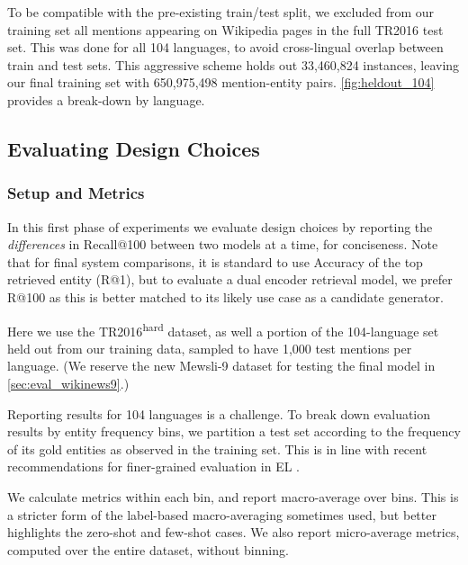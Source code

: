 \documentclass[11pt,a4paper]{article}
\newcommand*{\TR}{TR2016\textsuperscript{hard}}
\begin{document}
To be compatible with the pre-existing train/test split, we excluded from our training set all mentions appearing on Wikipedia pages in the full TR2016 test set.
This was done for all 104 languages, to avoid cross-lingual overlap between train and test sets.
This aggressive scheme holds out 33,460,824 instances, leaving our final training set with 650,975,498 mention-entity pairs. \autoref{fig:heldout_104} provides a break-down by language.

\subsection{Evaluating Design Choices}\label{sec:eval_design_choices}

\subsubsection{Setup and Metrics}
In this first phase of experiments we evaluate design choices by reporting the \emph{differences} in Recall@100 between two models at a time, for conciseness.
Note that for final system comparisons, it is standard to use Accuracy of the top retrieved entity (R@1), but to evaluate a dual encoder retrieval model, we prefer R@100 as this is better matched to its likely use case as a candidate generator.

Here we use the \TR{} dataset, as well a portion of the 104-language set held out from our training data, sampled to have 1,000 test mentions per language.
(We reserve the new \mbox{Mewsli-9} dataset for testing the final model in \autoref{sec:eval_wikinews9}.)

Reporting results for 104 languages is a challenge. 
To break down evaluation results by entity
frequency bins, we partition a test set according to the frequency of its gold entities as observed in the training set.
This is in line with recent recommendations for finer-grained evaluation in EL \citep{waitelonis-gerbil2016,ilievski-etal-2018-systematic}.

We calculate 
metrics within each bin, and report macro-average over bins. 
This is a stricter form of the label-based macro-averaging sometimes used,
but better highlights the zero-shot and few-shot
cases. We also report micro-average metrics, computed over the entire dataset, without binning.
\end{document}
